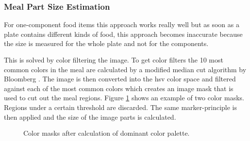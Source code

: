 \subsubsection*{Meal Part Size Estimation}
For one-component food items this approach works really well but as soon as a plate contains different kinds of food, this approach becomes inaccurate because the size is measured for the whole plate and not for the components.

This is solved by color filtering the image. To get color filters the 10 most common colors in the meal are calculated by a modified median cut algorithm by Bloomberg \cite{Bloomberg2008}. The image is then converted into the \gls{hsv} color space and filtered against each of the most common colors which creates an image mask that is used to cut out the meal regions. Figure \ref{fig:colorMasks} shows an example of two color masks. Regions under a certain threshold are discarded. The same marker-principle is then applied and the size of the image parts is calculated.

\begin{figure}[htb]
	\centering
	\hspace{\fill}%
	\hspace{\fill}%
	\hspace{\fill}%
	\caption{Color masks after calculation of dominant color palette.}
	\label{fig:colorMasks}
\end{figure}